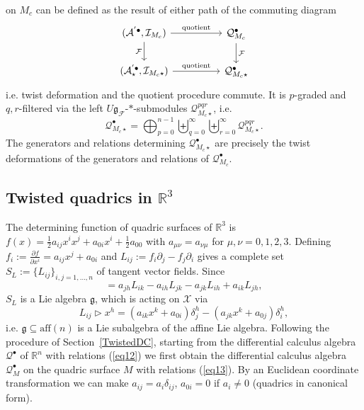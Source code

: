 \documentclass[a4paper,11pt]{article}
\begin{document}
on $M_c$ can be defined as the result of either path of the commuting diagram
\begin{equation}\label{eq13}
\begin{tikzcd}
(\mathcal{A}^{'\bullet},\mathcal{I}_{M_c}) \arrow{d}[swap]{\mathcal{F}}
\arrow{rr}{\text{quotient}}
& & \mathcal{Q}^\bullet_{M_c} \arrow{d}{\mathcal{F}}\\
(\mathcal{A}^{'\bullet}_\star,\mathcal{I}_{M_c\star})
\arrow{rr}{\text{quotient}}
& & \mathcal{Q}^\bullet_{M_c\star}
\end{tikzcd}
\end{equation}
i.e. twist deformation and the quotient procedure commute. 
It is $p$-graded and $q,r$-filtered via the left 
$U\mathfrak{g}_\mathcal{F}$-$*$-submodules $\mathcal{Q}^{pqr}_{M_c\star}$, i.e.
\begin{equation}
    \mathcal{Q}^\bullet_{M_c\star}=
    \bigoplus_{p=0}^{n-1}\biguplus_{q=0}^\infty
    \biguplus_{r=0}^\infty\mathcal{Q}^{pqr}_{M_c\star}.
\end{equation}
The generators and relations determining $\mathcal{Q}^\bullet_{M_c\star}$
are precisely the twist deformations of the generators and relations of
$\mathcal{Q}^\bullet_{M_c}$.


\subsection{Twisted quadrics in \texorpdfstring{$\mathbb{R}^3$}{R3}}\label{TwistedQuad}

The determining function of quadric surfaces of $\mathbb{R}^3$ is
$f(x)=\frac{1}{2}a_{ij}x^ix^j+a_{0i}x^i+\frac{1}{2}a_{00}$
with $a_{\mu\nu}=a_{\nu\mu}$ for $\mu,\nu=0,1,2,3$.
Defining $f_i:=\frac{\partial f}{\partial x^i}=a_{ij}x^j+a_{0i}$ and
$L_{ij}:=f_i\partial_j-f_j\partial_i$ gives a complete set
$S_L:=\{L_{ij}\}_{i,j=1,\ldots,n}$ of tangent vector fields.
Since
\begin{equation}
    [L_{ij},L_{hk}]
    =a_{jh}L_{ik}-a_{ih}L_{jk}-a_{jk}L_{ih}+a_{ik}L_{jh},
\end{equation}
$S_L$ is a Lie algebra $\mathfrak{g}$, which is acting on $\mathcal{X}$ via
\begin{equation}
    L_{ij}\rhd x^h
    =(a_{ik}x^k+a_{0i})\delta^h_j
    -(a_{jk}x^k+a_{0j})\delta^h_i,
\end{equation}
i.e. $\mathfrak{g}\subseteq\mathrm{aff}(n)$ is a Lie subalgebra of the affine Lie
algebra. Following the procedure of Section~\ref{TwistedDC},
starting from the differential calculus algebra $\mathcal{Q}^\bullet$ of $\mathbb{R}^n$
with relations (\ref{eq12}) we first obtain the differential calculus algebra
$\mathcal{Q}^\bullet_M$ on the quadric surface $M$ with relations (\ref{eq13}).
By an Euclidean coordinate transformation %
we can make $a_{ij}=a_i\delta_{ij}$, %
$a_{0i}=0$ if  $a_i\neq 0$ (quadrics in canonical form).
\end{document}
